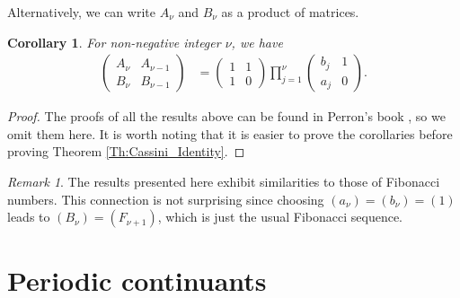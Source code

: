 \documentclass[12pt]{article}
\theoremstyle{plain}
\newtheorem{corollary}[theorem]{Corollary}
\theoremstyle{definition}
\theoremstyle{remark}
\newtheorem{remark}[theorem]{Remark}
\begin{document}
Alternatively, we can write $ A_\nu $ and $ B_\nu $ as a product of matrices. 
\begin{corollary} For non-negative integer $ \nu $, we have
\begin{align*}
	\begin{pmatrix} A_\nu & A_{\nu - 1} \\ B_\nu & B_{\nu - 1} \end{pmatrix} &= \begin{pmatrix} 1 & 1 \\ 1 & 0 \end{pmatrix} \prod_{j = 1}^\nu \begin{pmatrix} b_j & 1 \\ a_j & 0 \end{pmatrix}.
\end{align*}
\end{corollary}

\begin{proof} The proofs of all the results above can be found in Perron's book \cite{Perron_13}, so we omit them here. It is worth noting that it is easier to prove the corollaries before proving Theorem \ref{Th:Cassini_Identity}.
\end{proof}

\begin{remark} The results presented here exhibit similarities to those of Fibonacci numbers. This connection is not surprising since choosing $ (a_\nu) = (b_\nu) = (1) $ leads to $ (B_\nu) = (F_{\nu + 1}) $, which is just the usual Fibonacci sequence.
\end{remark}

\section{Periodic continuants} \label{Sec:Periodic_Continuant}
\end{document}
